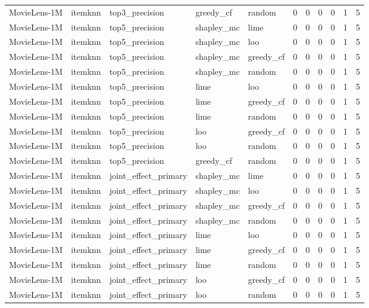 \begin{table}[t]
{\begin{tabular}{lllllrrrrrr}
MovieLens-1M & itemknn & top3\_precision & greedy\_cf & random & 0 & 0 & 0 & 0 & 1 & 5 \\
MovieLens-1M & itemknn & top5\_precision & shapley\_mc & lime & 0 & 0 & 0 & 0 & 1 & 5 \\
MovieLens-1M & itemknn & top5\_precision & shapley\_mc & loo & 0 & 0 & 0 & 0 & 1 & 5 \\
MovieLens-1M & itemknn & top5\_precision & shapley\_mc & greedy\_cf & 0 & 0 & 0 & 0 & 1 & 5 \\
MovieLens-1M & itemknn & top5\_precision & shapley\_mc & random & 0 & 0 & 0 & 0 & 1 & 5 \\
MovieLens-1M & itemknn & top5\_precision & lime & loo & 0 & 0 & 0 & 0 & 1 & 5 \\
MovieLens-1M & itemknn & top5\_precision & lime & greedy\_cf & 0 & 0 & 0 & 0 & 1 & 5 \\
MovieLens-1M & itemknn & top5\_precision & lime & random & 0 & 0 & 0 & 0 & 1 & 5 \\
MovieLens-1M & itemknn & top5\_precision & loo & greedy\_cf & 0 & 0 & 0 & 0 & 1 & 5 \\
MovieLens-1M & itemknn & top5\_precision & loo & random & 0 & 0 & 0 & 0 & 1 & 5 \\
MovieLens-1M & itemknn & top5\_precision & greedy\_cf & random & 0 & 0 & 0 & 0 & 1 & 5 \\
MovieLens-1M & itemknn & joint\_effect\_primary & shapley\_mc & lime & 0 & 0 & 0 & 0 & 1 & 5 \\
MovieLens-1M & itemknn & joint\_effect\_primary & shapley\_mc & loo & 0 & 0 & 0 & 0 & 1 & 5 \\
MovieLens-1M & itemknn & joint\_effect\_primary & shapley\_mc & greedy\_cf & 0 & 0 & 0 & 0 & 1 & 5 \\
MovieLens-1M & itemknn & joint\_effect\_primary & shapley\_mc & random & 0 & 0 & 0 & 0 & 1 & 5 \\
MovieLens-1M & itemknn & joint\_effect\_primary & lime & loo & 0 & 0 & 0 & 0 & 1 & 5 \\
MovieLens-1M & itemknn & joint\_effect\_primary & lime & greedy\_cf & 0 & 0 & 0 & 0 & 1 & 5 \\
MovieLens-1M & itemknn & joint\_effect\_primary & lime & random & 0 & 0 & 0 & 0 & 1 & 5 \\
MovieLens-1M & itemknn & joint\_effect\_primary & loo & greedy\_cf & 0 & 0 & 0 & 0 & 1 & 5 \\
MovieLens-1M & itemknn & joint\_effect\_primary & loo & random & 0 & 0 & 0 & 0 & 1 & 5 \\

\end{tabular}}
\end{table}
